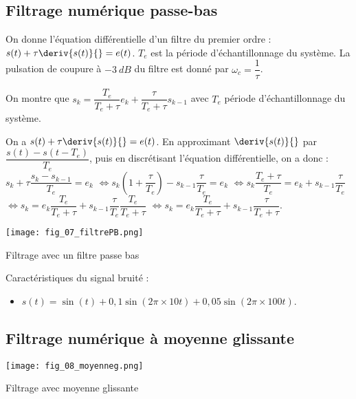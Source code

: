\subsection{Filtrage numérique passe-bas}
\begin{defi}
On donne l'équation différentielle d'un filtre du premier ordre : $s(t)+\tau \deriv{s(t)}{} = e(t)$.  $T_e$ est la période d'échantillonnage du système. La pulsation de coupure à $-\SI{3}{dB}$ du filtre est donné par $\omega_c = \dfrac{1}{\tau}$.

On montre que $s_k = \dfrac{T_e}{T_e+\tau} e_k + \dfrac{\tau}{T_e+\tau} s_{k-1}$ avec $T_e$ période d'échantillonnage du système.  
\end{defi}

\begin{demo}
On a  $s(t)+\tau \deriv{s(t)}{} = e(t)$. En approximant $\deriv{s(t)}{}$ par $\dfrac{s(t) -s(t-T_e)}{T_e}$, puis en discrétisant l'équation différentielle, on a donc : 
 $s_k +\tau \dfrac{s_k - s_{k-1}}{T_e} = e_k$
 $\Leftrightarrow s_k \left(1+\dfrac{\tau}{T_e}\right) - s_{k-1}\dfrac{\tau}{T_e} = e_k$
 $\Leftrightarrow s_k \dfrac{T_e+\tau}{T_e}  = e_k + s_{k-1}\dfrac{\tau}{T_e}$
 $\Leftrightarrow s_k   = e_k \dfrac{T_e}{T_e+\tau}+ s_{k-1}\dfrac{\tau}{T_e}\dfrac{T_e}{T_e+\tau}$
 $\Leftrightarrow s_k   = e_k \dfrac{T_e}{T_e+\tau}+ s_{k-1}\dfrac{\tau}{T_e+\tau}$.
\end{demo}


\begin{marginfigure}
\texttt{[image: fig\_07\_filtrePB.png]}
\caption{Filtrage avec un filtre passe bas}
\end{marginfigure}



Caractéristiques du signal bruité :
\begin{itemize}
\item $s(t)=\sin(t) + 0,1\sin(2\pi \times 10 t)+ 0,05\sin(2\pi \times 100 t)$.
\end{itemize}



\subsection{Filtrage numérique à moyenne glissante} 

\begin{marginfigure}
\texttt{[image: fig\_08\_moyenneg.png]}
\caption{Filtrage avec moyenne glissante}
\end{marginfigure}

